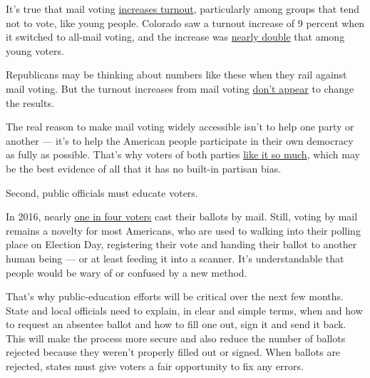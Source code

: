 It's true that mail voting
\href{https://www.vox.com/policy-and-politics/2018/5/23/17383400/vote-by-mail-home-california-alaska-nebraska}{increases
turnout}, particularly among groups that tend not to vote, like young
people. Colorado saw a turnout increase of 9 percent when it switched to
all-mail voting, and the increase was
\href{https://www.nytimes.com/2020/05/04/opinion/coronavirus-vote-by-mail.html}{nearly
double} that among young voters.

Republicans may be thinking about numbers like these when they rail
against mail voting. But the turnout increases from mail voting
\href{https://www.nytimes.com/2020/04/10/us/politics/vote-by-mail.html}{don't
appear} to change the results.

The real reason to make mail voting widely accessible isn't to help one
party or another --- it's to help the American people participate in
their own democracy as fully as possible. That's why voters of both
parties
\href{https://news.gallup.com/poll/310586/americans-favor-voting-mail-option-november.aspx}{like
it so much}, which may be the best evidence of all that it has no
built-in partisan bias.

Second, public officials must educate voters.

In 2016, nearly
\href{https://www.eac.gov/documents/2017/10/17/eavs-deep-dive-early-absentee-and-mail-voting-data-statutory-overview}{one
in four voters} cast their ballots by mail. Still, voting by mail
remains a novelty for most Americans, who are used to walking into their
polling place on Election Day, registering their vote and handing their
ballot to another human being --- or at least feeding it into a scanner.
It's understandable that people would be wary of or confused by a new
method.

That's why public-education efforts will be critical over the next few
months. State and local officials need to explain, in clear and simple
terms, when and how to request an absentee ballot and how to fill one
out, sign it and send it back. This will make the process more secure
and also reduce the number of ballots rejected because they weren't
properly filled out or signed. When ballots are rejected, states must
give voters a fair opportunity to fix any errors.

